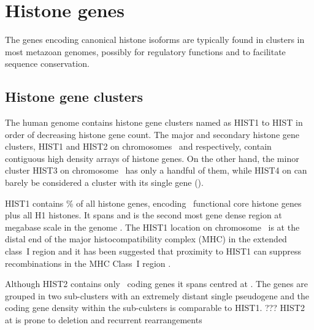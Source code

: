 \section{Histone genes}

  The genes encoding canonical histone isoforms are typically found in clusters in most metazoan genomes, 
  possibly for regulatory functions and to facilitate sequence conservation.

  \subsection{Histone gene clusters}
    The human genome contains  histone gene clusters 
	named as HIST1 to HIST in order of decreasing histone gene count.
    The major and secondary histone gene clusters,
    HIST1 and HIST2 on chromosomes~\HISTOneLocus{} and \HISTTwoLocus{} respectively,
    contain contiguous high density arrays of histone genes. On the other hand, the minor
    cluster HIST3 on chromosome~\HISTThreeLocus{} has only a handful of them, while HIST4
    on \HISTFourLocus{} can barely be considered a cluster with its single gene
    ().

    HIST1 contains \% of all histone genes, 
	encoding \CodingGenesInHISTOne{}~functional core histone genes plus all H1 histones. 
	It spans \HISTOneSpan{} and is the second most gene dense region at megabase scale in the genome \citep{MHC-III-analysis}. 
	The HIST1 location on chromosome~\HISTOneLocus{}
	is at the distal end of the major histocompatibility complex (MHC) in the extended class~I region \citep{MHC-I-transcript, MHC-complete-sequencing-1999} 
	and it has been suggested that proximity to HIST1 can suppress recombinations in the MHC Class~I region \citep{MHC-repressed-by-HIST}.

    Although HIST2 contains only \CodingGenesInHISTTwo{}~coding genes it spans \HISTTwoSpan{} centred at \HISTTwoLocus{}.
	The genes are grouped in two sub-clusters with an extremely distant single pseudogene 
	and the coding gene density within the sub-culsters is comparable to HIST1. ???
    HIST2 at \HISTTwoLocus{} is prone to deletion and recurrent rearrangements \citep{HISTTwo-prone-deletion-discovery, HISTTwo-prone-deletion-focus}


